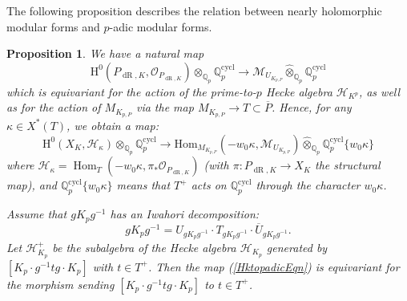 \documentclass[10pt, oneside]{amsart}
\numberwithin{equation}{subsection}
\newtheorem{proposition}[equation]{Proposition}
\theoremstyle{definition}
\theoremstyle{remark}
\newcommand{\mbb}[1]{\mathbb{#1}}
\newcommand{\hatot}{\hat{\otimes}}
\newcommand{\opn}[1]{\operatorname{#1}}
\def\Q{\mathbb{Q}}
\def\qp{{\Q_p}}
\begin{document}
The following proposition describes the relation between nearly holomorphic modular forms and $p$-adic modular forms.

\begin{proposition} 
We have a natural map 
\begin{equation} \label{PdRtoMdRNoweight}
\mathrm{H}^0(P_{\opn{dR},K}, \mathcal{O}_{P_{\opn{dR},K}}) \otimes_{\qp} \Q_p^{\opn{cycl}} \rightarrow \mathscr{M}_{U_{K_{p,P}}} \hatot_{\mbb{Q}_p} \Q_p^{\opn{cycl}}
\end{equation}
which is equivariant for the action of the prime-to-$p$ Hecke algebra $\mathcal{H}_{K^p}$, as well as
for the action of $M_{K_{p,P}}$ via the map $M_{K_{p,P}} \rightarrow T \subset \overline{P}$. Hence, for any $\kappa \in X^*(T)$, we obtain a map:
\begin{equation} \label{HktopadicEqn}
\mathrm{H}^0(X_K, \mathcal{H}_\kappa) \otimes_{\qp} \Q_p^{\opn{cycl}} \rightarrow \mathrm{Hom}_{M_{K_{p,P}}}( -w_0\kappa, \mathscr{M}_{U_{K_{p,P}}}) \hatot_{\Q_p} \Q_p^{\opn{cycl}}\{w_0\kappa\}
\end{equation}
where $\mathcal{H}_{\kappa}=\opn{Hom}_{T}(-w_0\kappa, \pi_*\mathcal{O}_{P_{\opn{dR}, K}} )$ (with $\pi \colon P_{\opn{dR}, K} \to X_K$ the structural map), and $\Q_p^{\opn{cycl}}\{w_0\kappa\}$ means that $T^+$ acts on $\mbb{Q}_p^{\opn{cycl}}$ through the character $w_0\kappa$.

Assume that $gK_pg^{-1}$ has an Iwahori decomposition: 
\[
g K_p g^{-1} = U_{gK_p g^{-1}} \cdot T_{gK_pg^{-1}} \cdot \overline{U}_{gK_p g^{-1}}.
\]
Let $\mathcal{H}_{K_p}^+$ be the subalgebra of the Hecke algebra $\mathcal{H}_{K_p}$ generated by $[K_p \cdot g^{-1} t  g \cdot K_p]$ with $t \in T^+$. Then the map (\ref{HktopadicEqn}) is equivariant for the morphism sending $[K_p \cdot g^{-1} t g \cdot K_p]$ to $t \in T^+$.
\end{proposition}
\end{document}
